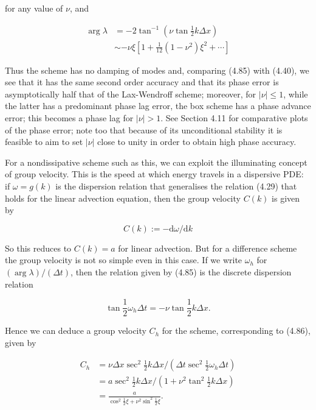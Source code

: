 \documentclass[10pt]{article}
\begin{document}
for any value of \(\nu\), and

\[
\begin{aligned}
\arg \lambda & =-2 \tan ^{-1}\left(\nu \tan \frac{1}{2} k \Delta x\right) \\
& \sim-\nu \xi\left[1+\frac{1}{12}\left(1-\nu^{2}\right) \xi^{2}+\cdots\right]
\end{aligned}
\]

Thus the scheme has no damping of modes and, comparing (4.85) with (4.40), we see that it has the same second order accuracy and that its phase error is asymptotically half that of the Lax-Wendroff scheme; moreover, for \(|\nu| \leq 1\), while the latter has a predominant phase lag error, the box scheme has a phase advance error; this becomes a phase lag for \(|\nu|>1\). See Section 4.11 for comparative plots of the phase error; note too that because of its unconditional stability it is feasible to aim to set \(|\nu|\) close to unity in order to obtain high phase accuracy.

For a nondissipative scheme such as this, we can exploit the illuminating concept of group velocity. This is the speed at which energy travels in a dispersive PDE: if \(\omega=g(k)\) is the dispersion relation that generalises the relation (4.29) that holds for the linear advection equation, then the group velocity \(C(k)\) is given by

\[
C(k):=-\mathrm{d} \omega / \mathrm{d} k
\]

So this reduces to \(C(k)=a\) for linear advection. But for a difference scheme the group velocity is not so simple even in this case. If we write \(\omega_{h}\) for \((\arg \lambda) /(\Delta t)\), then the relation given by (4.85) is the discrete dispersion relation

\[
\tan \frac{1}{2} \omega_{h} \Delta t=-\nu \tan \frac{1}{2} k \Delta x .
\]

Hence we can deduce a group velocity \(C_{h}\) for the scheme, corresponding to (4.86), given by

\[
\begin{aligned}
C_{h} & =\nu \Delta x \sec ^{2} \frac{1}{2} k \Delta x /\left(\Delta t \sec ^{2} \frac{1}{2} \omega_{h} \Delta t\right) \\
& =a \sec ^{2} \frac{1}{2} k \Delta x /\left(1+\nu^{2} \tan ^{2} \frac{1}{2} k \Delta x\right) \\
& =\frac{a}{\cos ^{2} \frac{1}{2} \xi+\nu^{2} \sin ^{2} \frac{1}{2} \xi} .
\end{aligned}
\]
\end{document}
